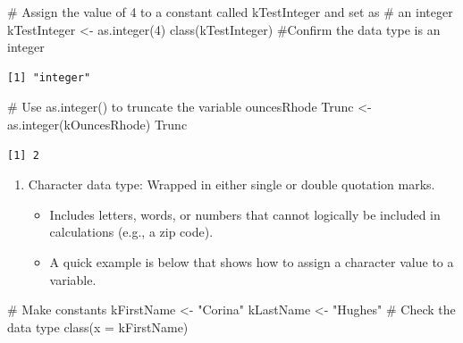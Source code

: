 \documentclass[
  letterpaper,
  DIV=11,
  numbers=noendperiod]{scrreprt}
\newenvironment{Shaded}{\begin{snugshade}}{\end{snugshade}}
\newcommand{\AttributeTok}[1]{\textcolor[rgb]{0.40,0.45,0.13}{#1}}
\newcommand{\CommentTok}[1]{\textcolor[rgb]{0.37,0.37,0.37}{#1}}
\newcommand{\DecValTok}[1]{\textcolor[rgb]{0.68,0.00,0.00}{#1}}
\newcommand{\FunctionTok}[1]{\textcolor[rgb]{0.28,0.35,0.67}{#1}}
\newcommand{\NormalTok}[1]{\textcolor[rgb]{0.00,0.23,0.31}{#1}}
\newcommand{\OtherTok}[1]{\textcolor[rgb]{0.00,0.23,0.31}{#1}}
\newcommand{\StringTok}[1]{\textcolor[rgb]{0.13,0.47,0.30}{#1}}
\providecommand{\tightlist}{%
  \setlength{\itemsep}{0pt}\setlength{\parskip}{0pt}}\usepackage{longtable,booktabs,array}
\begin{document}
\begin{Shaded}
\begin{Highlighting}[]
\CommentTok{\# Assign the value of 4 to a constant called kTestInteger and set as}
\CommentTok{\# an integer}
\NormalTok{kTestInteger }\OtherTok{\textless{}{-}} \FunctionTok{as.integer}\NormalTok{(}\DecValTok{4}\NormalTok{)}
\FunctionTok{class}\NormalTok{(kTestInteger)  }\CommentTok{\#Confirm the data type is an integer }
\end{Highlighting}
\end{Shaded}

\begin{verbatim}
[1] "integer"
\end{verbatim}

\begin{Shaded}
\begin{Highlighting}[]
\CommentTok{\# Use as.integer() to truncate the variable ouncesRhode}
\NormalTok{Trunc }\OtherTok{\textless{}{-}} \FunctionTok{as.integer}\NormalTok{(kOuncesRhode)}
\NormalTok{Trunc}
\end{Highlighting}
\end{Shaded}

\begin{verbatim}
[1] 2
\end{verbatim}

\begin{enumerate}
\def\labelenumi{\arabic{enumi}.}
\setcounter{enumi}{2}
\tightlist
\item
  Character data type: Wrapped in either single or double quotation
  marks.

  \begin{itemize}
  \tightlist
  \item
    Includes letters, words, or numbers that cannot logically be
    included in calculations (e.g., a zip code).
  \item
    A quick example is below that shows how to assign a character value
    to a variable.
  \end{itemize}
\end{enumerate}

\begin{Shaded}
\begin{Highlighting}[]
\CommentTok{\# Make constants}
\NormalTok{kFirstName }\OtherTok{\textless{}{-}} \StringTok{"Corina"}
\NormalTok{kLastName }\OtherTok{\textless{}{-}} \StringTok{"Hughes"}
\CommentTok{\# Check the data type}
\FunctionTok{class}\NormalTok{(}\AttributeTok{x =}\NormalTok{ kFirstName)}
\end{Highlighting}
\end{Shaded}
\end{document}
